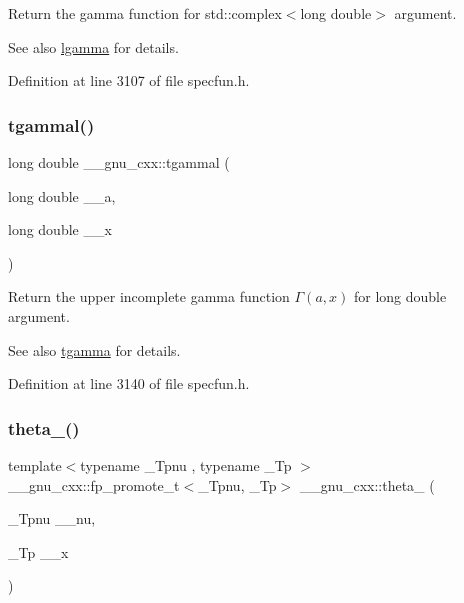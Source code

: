 Return the gamma function for {\ttfamily  std\+::complex$<$long double$>$ } argument.

\begin{DoxySeeAlso}{See also}
\hyperlink{group__mathsf__gnu_ga40fa5127f7c419ed1d8f1c6a6f96ea9b}{lgamma} for details. 
\end{DoxySeeAlso}


Definition at line 3107 of file specfun.\+h.

\mbox{\label{group__mathsf__gnu_gabebff9ffba6acf55f3a3cd716ef5007a}} 
\subsubsection{\texorpdfstring{tgammal()}{tgammal()}\hspace{0.1cm}{\footnotesize\ttfamily [3/3]}}
{\footnotesize\ttfamily long double \+\_\+\+\_\+gnu\+\_\+cxx\+::tgammal (\begin{DoxyParamCaption}\item[{long double}]{\+\_\+\+\_\+a,  }\item[{long double}]{\+\_\+\+\_\+x }\end{DoxyParamCaption})\hspace{0.3cm}{\ttfamily [inline]}}

Return the upper incomplete gamma function $ \Gamma(a,x) $ for {\ttfamily long double} argument.

\begin{DoxySeeAlso}{See also}
\hyperlink{group__mathsf__gnu_ga73a634663e4eceb1e6bcf3fc16773b7b}{tgamma} for details. 
\end{DoxySeeAlso}


Definition at line 3140 of file specfun.\+h.

\mbox{\label{group__mathsf__gnu_gaa2e5a3a5f550fe032a596a8b01c878c0}} 
\subsubsection{\texorpdfstring{theta\+\_()}{theta\_1()}}
{\footnotesize\ttfamily template$<$typename \+\_\+\+Tpnu , typename \+\_\+\+Tp $>$ \\
\+\_\+\+\_\+gnu\+\_\+cxx\+::fp\+\_\+promote\+\_\+t$<$\+\_\+\+Tpnu, \+\_\+\+Tp$>$ \+\_\+\+\_\+gnu\+\_\+cxx\+::theta\+\_ (\begin{DoxyParamCaption}\item[{\+\_\+\+Tpnu}]{\+\_\+\+\_\+nu,  }\item[{\+\_\+\+Tp}]{\+\_\+\+\_\+x }\end{DoxyParamCaption})\hspace{0.3cm}{\ttfamily [inline]}}

